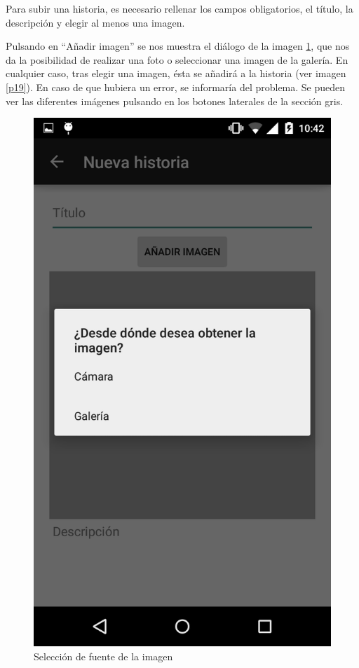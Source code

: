 \documentclass[11pt,a4paper, titlepage]{article}
\begin{document}
	Para subir una historia, es necesario rellenar los campos obligatorios, el título, la descripción y elegir al menos una imagen.
	
	Pulsando en ``Añadir imagen'' se nos muestra el diálogo de la imagen \ref{p18}, que nos da la posibilidad de realizar una foto o seleccionar una imagen de la galería. En cualquier caso, tras elegir una imagen, ésta se añadirá a la historia (ver imagen \ref{p19}). En caso de que hubiera un error, se informaría del problema. Se pueden ver las diferentes imágenes pulsando en los botones laterales de la sección gris.
	
		\begin{figure}[hbtp]
			\centering
			\includegraphics[scale = 0.25 ]{img/12}
			\caption{Selección de fuente de la imagen}
			\label{p18}
		\end{figure}
		
\end{document}
